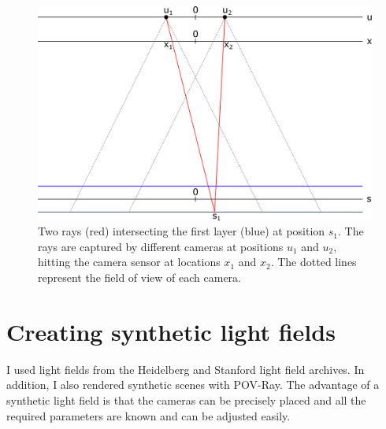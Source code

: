 \documentclass[11pt,a4paper,titlepage]{article}
\begin{document}
\begin{figure}[h]
	\centering
	\includegraphics[scale=0.5]{sketches/camera_layers_sketch.png} 
	\caption{Two rays (red) intersecting the first layer (blue) at position $s_1$. The rays are captured by different cameras at positions $u_1$ and $u_2$, hitting the camera sensor at locations $x_1$ and $x_2$. The dotted lines represent the field of view of each camera.}
	\label{fig:cameras_layers_sketch}
\end{figure}

\section{Creating synthetic light fields}
I used light fields from the Heidelberg and Stanford light field archives. In addition, I also rendered synthetic scenes with POV-Ray. The advantage of a synthetic light field is that the cameras can be precisely placed and all the required parameters are known and can be adjusted easily. 

\newpage


\end{document}
